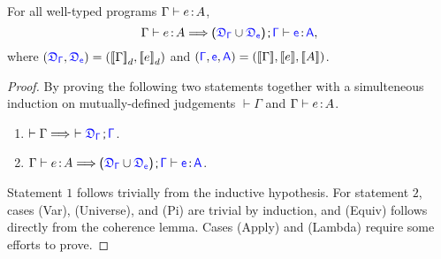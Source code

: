 \begin{theorem} 
\label{theorem:type preservation}
For all well-typed programs $\Gamma \vdash {e} \hspace{0.5mm}{:}\hspace{0.5mm} {A}$,
\begin{equation*}
	{\Gamma} \vdash {e} \goodcolon {A} \Longrightarrow 
	\sfpl \target{\fdef_{\Gamma}} \cup \target{\fdef_{e}} \sfpr \semicolon \target{\Gamma} \vdash \target{e} \goodcolon \target{A},
\end{equation*}
where $(\target{\fdef_{\Gamma}}, \target{\fdef_{e}}) 
= (\bbracket{{\Gamma}}_d, \bbracket{{e}}_d)$ and 
$(\target{\Gamma}, \target{{e}}, \target{{A}}) 
= (\bbracket{{\Gamma}}, \bbracket{{e}}, \bbracket{{A}})$.
\begin{proof}
By proving the following two statements together with a simulteneous induction on mutually-defined judgements $\vdash {\Gamma}$ and ${\Gamma} \vdash {e} \hspace{0.5mm}{:}\hspace{0.5mm} {A}$.
\begin{enumerate}
	\item $\vdash {\Gamma} \Longrightarrow\  \vdash \target{\fdef_{\Gamma}} \semicolon \target{\Gamma}$.
	\item ${\Gamma} \vdash {e} \goodcolon {A} \Longrightarrow 
		\sfpl \target{\fdef_{\Gamma}} \cup \target{\fdef_{e}} \sfpr \semicolon \target{\Gamma} \vdash \target{e} \goodcolon \target{A}$.
\end{enumerate}
Statement $1$ follows trivially from the inductive hypothesis. For statement $2$, cases (Var), (Universe), and (Pi) are trivial by induction, and (Equiv) follows directly from the coherence lemma. Cases (Apply) and (Lambda) require some efforts to prove.


\end{proof}
\end{theorem}
